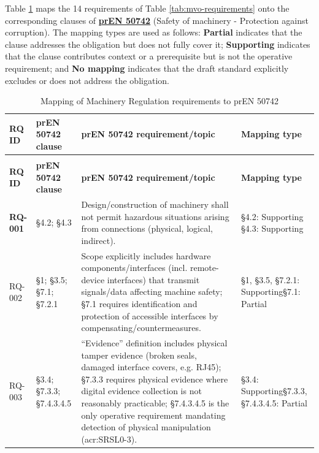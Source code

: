 Table \ref{tab:pren50742-mapping} maps the 14 requirements of Table \ref{tab:mvo-requirements} onto the corresponding clauses of \hyperref[subsec:pren_50742]{\textbf{prEN 50742}} (Safety of machinery - Protection against corruption). The mapping types are used as follows: \textbf{Partial} indicates that the clause addresses the obligation but does not fully cover it; \textbf{Supporting} indicates that the clause contributes context or a prerequisite but is not the operative requirement; and \textbf{No mapping} indicates that the draft standard explicitly excludes or does not address the obligation.
\begin{longtable}{|>{\bfseries}p{1cm}|p{2.5cm}|p{9cm}|>{\centering\arraybackslash}p{2cm}|}
	\caption{Mapping of Machinery Regulation requirements to prEN 50742} 
	\label{tab:pren50742-mapping} \\
	\hline
	\textbf{RQ ID} & \textbf{prEN 50742 clause} & \textbf{prEN 50742 requirement/topic} & \textbf{Mapping type} \\
	\hline
	\endfirsthead
	
	\multicolumn{4}{c}{\tablename\ \thetable{} continued from previous page} \\
	\hline
	\textbf{RQ ID} & \textbf{prEN 50742 clause} & \textbf{prEN 50742 requirement/topic} & \textbf{Mapping type} \\
	\hline
	\endhead
	
	\hline
	\endlastfoot
	RQ-001 &
	\S4.2; \newline \S4.3 &
	Design/construction of machinery shall not permit hazardous situations arising from connections (physical, logical, indirect). &
	\S4.2: Supporting \newline\S4.3: Supporting \\
	\hline
	
	
	RQ-002 &
	\S1;  \newline \S3.5;  \newline \S7.1;  \newline \S7.2.1 &
	Scope explicitly includes hardware components/interfaces (incl. remote-device interfaces) that transmit signals/data affecting machine safety; \S7.1 requires identification and protection of accessible interfaces by compensating/countermeasures. &
	\S1, \S3.5, \S7.2.1: Supporting\newline\S7.1: Partial \\
	\hline
	
	RQ-003 &
	\S3.4;  \newline \S7.3.3;  \newline\S7.4.3.4.5 &
	``Evidence'' definition includes physical tamper evidence (broken seals, damaged interface covers, e.g. RJ45); \S7.3.3 requires physical evidence where digital evidence collection is not reasonably practicable; \S7.4.3.4.5 is the only operative requirement mandating detection of physical manipulation (\gls{acr:SRSL}0-3).  &
	\S3.4: Supporting\newline\S7.3.3, \S7.4.3.4.5: Partial \\
	\hline
	

\end{longtable}
